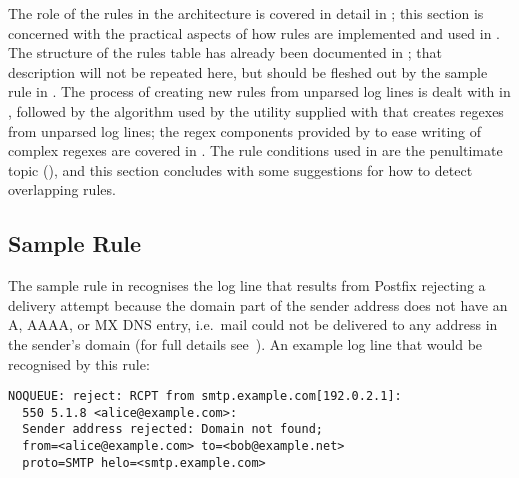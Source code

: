 The role of the rules in the architecture is covered in detail in
; this section is concerned with the
practical aspects of how rules are implemented and used in \parsername{}.
The structure of the rules table has already been documented in
; that description will not be repeated here, but
should be fleshed out by the sample rule in .  The process of creating new rules from unparsed log lines
is dealt with in ,
followed by the algorithm used by the utility supplied with \parsername{}
that creates regexes from unparsed log lines; the regex components provided
by \parsername{} to ease writing of complex regexes are covered in
.  The rule conditions used in \parsername{}
are the penultimate topic (),
and this section concludes with some suggestions for how to detect
overlapping rules.

\subsection{Sample Rule}

\label{example rule in implementation}

The sample rule in 
recognises the log line that results from Postfix rejecting a delivery
attempt because the domain part of the sender address does not have an A,
AAAA, or MX DNS entry, i.e.\ mail could not be delivered to any address in
the sender's domain (for full details
see~\cite{reject-unknown-sender-domain}).  An example log line that would
be recognised by this rule:


\begin{verbatim}
NOQUEUE: reject: RCPT from smtp.example.com[192.0.2.1]:
  550 5.1.8 <alice@example.com>:
  Sender address rejected: Domain not found;
  from=<alice@example.com> to=<bob@example.net>
  proto=SMTP helo=<smtp.example.com>
\end{verbatim}

